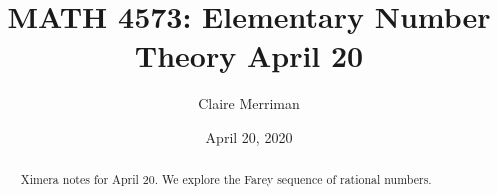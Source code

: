\documentclass{xourse}
\title{MATH 4573: Elementary Number Theory April 20}
\author{Claire Merriman}
\date{April 20, 2020}
\begin{document}
  
\begin{abstract} %
Ximera notes for April 20. We explore the Farey sequence of rational numbers.
\end{abstract}  
\maketitle 
 
\end{document}

